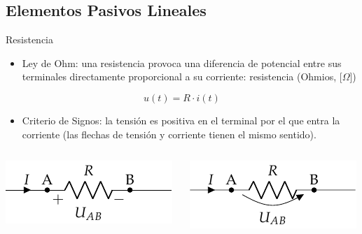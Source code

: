 \documentclass[xcolor={usenames,svgnames,dvipsnames}]{beamer}
\begin{document}
\subsection{Elementos Pasivos Lineales}
\label{sec:org87bfc8f}
\begin{frame}[label={sec:orgca7ddae}]{Resistencia}
\begin{itemize}
\item \alert{Ley de Ohm}: una resistencia provoca una \alert{diferencia de potencial} entre sus terminales \alert{directamente proporcional} a su corriente: \alert{resistencia} (Ohmios, [\(\Omega\)])
\end{itemize}
\[
u(t) = R \cdot i(t)
\]
\begin{itemize}
\item \alert{Criterio de Signos}: la tensión es positiva en el terminal por el que entra la corriente (las flechas de tensión y corriente tienen el mismo sentido).
\end{itemize}
\begin{columns}
\begin{column}{0.5\columnwidth}
\begin{center}
\includegraphics[height=0.2\textheight]{figs/Resistencia.pdf}
\end{center}
\end{column}
\begin{column}{0.5\columnwidth}
\begin{center}
\includegraphics[height=0.2\textheight]{figs/Resistencia_Flecha.pdf}
\end{center}
\end{column}
\end{columns}
\end{frame}
\end{document}
